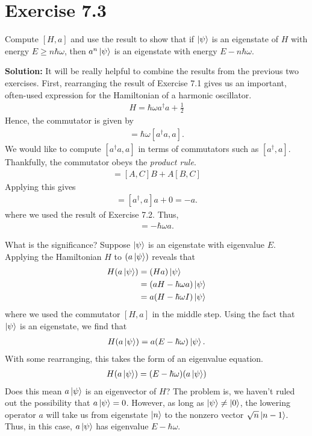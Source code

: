 \documentclass{book}
\begin{document}
\section*{Exercise 7.3}
    Compute $[H, a]$ and use the result to show that if $\ket{\psi}$ is an eigenstate of $H$ with energy $E \geq n\hbar \omega$, then $a^n \ket{\psi}$ is an eigenstate with energy $E - n\hbar \omega$.

    \textbf{Solution:} It will be really helpful to combine the results from the previous two exercises. First, rearranging the result of Exercise 7.1 gives us an important, often-used expression for the Hamiltonian of a harmonic oscillator.
    \begin{align}
        H = \hbar \omega a^\dagger a + \frac{1}{2}
    \end{align}
    Hence, the commutator is given by
    \begin{align}
        [H, a] = \hbar \omega [a^\dagger a , a].
    \end{align}
    We would like to compute $[a^\dagger a, a]$ in terms of commutators such as $[a^\dagger, a]$. Thankfully, the commutator obeys the \emph{product rule}. 
    \begin{align}
        [AB, C] = [A, C]B + A[B,C]
    \end{align}
    Applying this gives
    \begin{align}
        [a^\dagger a, a] = [a^\dagger, a] a + 0 = -a.
    \end{align}
    where we used the result of Exercise 7.2. Thus,
    \begin{align}
        [H,a] = -\hbar\omega a.
    \end{align}

    What is the significance? Suppose $\ket{\psi}$ is an eigenstate with eigenvalue $E$. Applying the Hamiltonian $H$ to $(a\ket{\psi})$ reveals that
    \begin{align}
    \begin{aligned}
        H (a\ket{\psi}) &= (Ha) \ket{\psi} \\
        &= (aH - \hbar \omega a)\ket{\psi} \\
        &= a(H- \hbar \omega I) \ket{\psi}
    \end{aligned}
    \end{align}
    where we used the commutator $[H,a]$ in the middle step. Using the fact that $\ket{\psi}$ is an eigenstate, we find that
    \begin{align}
        H(a\ket{\psi}) = a(E-\hbar\omega) \ket{\psi}.
    \end{align}
    With some rearranging, this takes the form of an eigenvalue equation.
    \begin{align}
        H(a\ket{\psi}) = (E-\hbar\omega) (a\ket{\psi})
    \end{align}
    Does this mean $a\ket{\psi}$ is an eigenvector of $H$? The problem is, we haven't ruled out the possibility that $a\ket{\psi} = 0$. However, as long as $\ket{\psi} \neq \ket{0}$, the lowering operator $a$ will take us from eigenstate $\ket{n}$ to the nonzero vector $\sqrt{n} \ket{n-1}$. Thus, in this case, $a\ket{\psi}$ has eigenvalue $E - \hbar \omega$.
\end{document}
